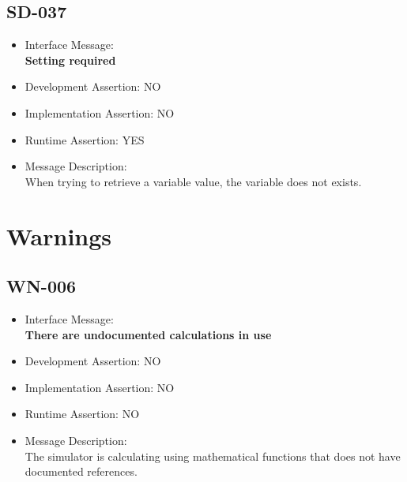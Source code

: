 \subsection{SD-037}
\begin{itemize}
  \item Interface Message:\\[1em]
    \textbf{Setting required}
  \item Development Assertion: NO
  \item Implementation Assertion: NO
  \item Runtime Assertion: YES
  \item Message Description:\\[1em]
    When trying to retrieve a variable value, the variable does not exists.
\end{itemize}

\section{Warnings}

\subsection{WN-006}
\begin{itemize}
  \item Interface Message:\\[1em]
    \textbf{There are undocumented calculations in use}
  \item Development Assertion: NO
  \item Implementation Assertion: NO
  \item Runtime Assertion: NO
  \item Message Description:\\[1em]
    The simulator is calculating using mathematical functions that does not have documented references.
\end{itemize}

